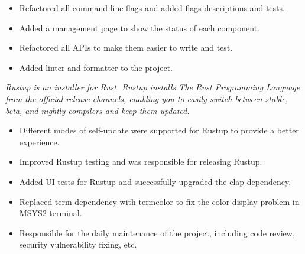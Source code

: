 \documentclass{software_engineer_rustin_liu}
\newcommand{\en}[1]{#1}
\newcommand{\zh}[1]{}
\begin{document}
\begin{itemize}
      \item \en{Refactored all command line flags and added flags descriptions and tests.}
            \zh{重构了所有命令行参数，并添加了参数说明和测试。}
      \item \en{Added a management page to show the status of each component.}
            \zh{添加了管理页面展示各组件状态。}
      \item \en{Refactored all APIs to make them easier to write and test.}
            \zh{重构了所有 API 使其更容易编写和测试。}
      \item \en{Added linter and formatter to the project.}
            \zh{为项目添加了 linter 和 formatter。}
\end{itemize}

\en{}
\zh{\datedsubsection{\textbf{Rustup - 前维护者}}{{\href{https://github.com/rust-lang/rustup/commits?author=hi-rustin}{110+ commits}}}}
\en{\textsl{Rustup is an installer for Rust. Rustup installs The Rust Programming Language from the official release channels, enabling you to easily switch between stable, beta, and nightly compilers and keep them updated.}}
\zh{\textsl{Rustup 是 Rust 的安装器。Rustup 从官方发布渠道安装 Rust 编程语言，使用户可以轻松地在稳定版、测试版和夜版编译器之间切换并保持更新。}}

\begin{itemize}
      \item \en{Different modes of self-update were supported for Rustup to provide a better experience.}
            \zh{为 Rustup 支持了 self-update 的不同模式来提供更好的使用体验。}
      \item \en{Improved Rustup testing and was responsible for releasing Rustup.}
            \zh{改善 Rustup 测试，负责发布 Rustup。}
      \item \en{Added UI tests for Rustup and successfully upgraded the clap dependency.}
            \zh{为 Rustup 添加了 UI 测试，顺利升级了 clap 依赖。}
      \item \en{Replaced term dependency with termcolor to fix the color display problem in MSYS2 terminal.}
            \zh{将 term 依赖替换为 termcolor，修复了 MSYS2 终端下颜色显示的问题。}
      \item \en{Responsible for the daily maintenance of the project, including code review, security vulnerability fixing, etc.}
            \zh{负责项目日常维护，包括代码审查、依赖升级、安全漏洞修复等。}
\end{itemize}
\end{document}
